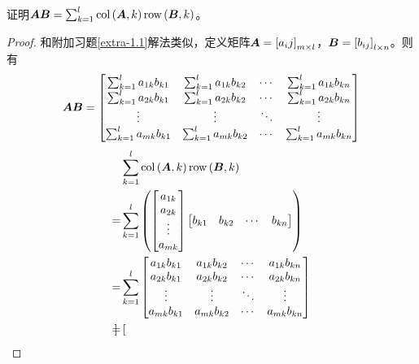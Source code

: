\begin{extraprob}
    证明\(\boldsymbol{A}\boldsymbol{B}=\sum_{k=1}^l\mathrm{col}\left( \boldsymbol{A},k \right)\mathrm{row}\left( \boldsymbol{B},k \right)\)。
\end{extraprob}
\begin{proof}
    和附加习题\ref{extra-1.1}解法类似，定义矩阵\(\boldsymbol{A}=\left[ a_ij \right]_{m\times l}\)，\(\boldsymbol{B}=\left[ b_{ij} \right]_{l\times n}\)。则有
    \begin{equation*}
        \boldsymbol{A}\boldsymbol{B}=
        \begin{bmatrix}
            \sum_{k=1}^la_{1k}b_{k1} & \sum_{k=1}^la_{1k}b_{k2} & \cdots & \sum_{k=1}^la_{1k}b_{kn} \\
            \sum_{k=1}^la_{2k}b_{k1} & \sum_{k=1}^la_{2k}b_{k2} & \cdots & \sum_{k=1}^la_{2k}b_{kn} \\
            \vdots                   & \vdots                   & \ddots & \vdots                   \\
            \sum_{k=1}^la_{mk}b_{k1} & \sum_{k=1}^la_{mk}b_{k2} & \cdots & \sum_{k=1}^la_{mk}b_{kn}
        \end{bmatrix}
    \end{equation*}
    \begin{align*}
          & \sum_{k=1}^l\mathrm{col}\left( \boldsymbol{A},k \right)\mathrm{row}\left( \boldsymbol{B},k \right)        \\ =&\sum_{k=1}^l
        \left( 
            \begin{bmatrix}
                a_{1k} \\a_{2k}\\\vdots\\a_{mk}
            \end{bmatrix}
            \begin{bmatrix}
                b_{k1} & b_{k2} & \cdots & b_{kn}
            \end{bmatrix}
         \right)                                                   \\
        = & \sum_{k=1}^l
        \begin{bmatrix}
            a_{1k}b_{k1} & a_{1k}b_{k2} & \cdots & a_{1k}b_{kn} \\
            a_{2k}b_{k1} & a_{2k}b_{k2} & \cdots & a_{2k}b_{kn} \\
            \vdots       & \vdots       & \ddots & \vdots       \\
            a_{mk}b_{k1} & a_{mk}b_{k2} & \cdots & a_{mk}b_{kn}
        \end{bmatrix} \\
        = &
        \begin{bmatrix}

\end{bmatrix}
\end{align*}
\end{proof}
